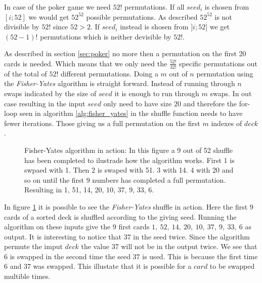 \documentclass[twoside,11pt,openright]{report}
\newcommand{\FY}{\textit{Fisher-Yates} }
\begin{document}
\bigskip

In case of the poker game we need $52!$ permutations. If all $seed_i$ is chosen from $[i;52]$ we would get $52^{52}$ possible permutations. As described $52^{52}$ is not divisible by $52!$ since $52>2$. If $seed_i$ instead is shosen from $]i;52]$ we get $(52-1)!$ permutations which is neither devisible by $52!$.

\bigskip

As described in section \ref{sec:poker} no more then a permutation on the first 20 cards is needed. Which means that we only need the $\frac{52!}{32!}$ specific permutations out of the total of $52!$ different permutations. Doing a $m$ out of $n$ permutation using the \FY algorithm is straight forward. Instead of running through $n$ swaps indicated by the size of $seed$ it is enough to run through $m$ swaps. In out case resulting in the input $seed$ only need to have size $20$ and therefore the for-loop seen in algorithm \ref{alg:fisher_yates} in the shuffle function needs to have fewer iterations. Those giving us a full permutation on the first $m$ indexes of $deck$.

\bigskip

\begin{figure}
\centering
\scalebox{1.5}{}
\caption{Fisher-Yates algorithm in action: In this figure a 9 out of 52 shuffle has been completed to ilustrade how the algorithm works. First 1 is swpaed with 1. Then 2 is swaped with 51. 3 with 14. 4 with 20 and so on until the first 9 numbers has completed a full permutation. Resulting in 1, 51, 14, 20, 10, 37, 9, 33, 6.}
\label{fig:fisher_yates}
\end{figure}

In figure \ref{fig:fisher_yates} it is possible to see the \FY shuffle in action. Here the first $9$ cards of a sorted deck is shuffled according to the giving seed. Running the algorithm on these inputs give the $9$ first cards $1,~52,~14,~20,~10,~37,~9,~33,~6$ as output. It is interesting to notice that $37$ in the seed twice. Since the algorithm permute the imput $deck$ the value $37$ will not be in the output twice. We see that $6$ is swapped in the second time the seed $37$ is used. This is because the first time $6$ and $37$ was swapped. This illustate that it is possible for a $card$ to be swapped multible times.


\end{document}
